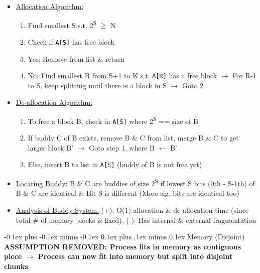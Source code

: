 \documentclass[landscape]{article}
\makeatletter
\renewcommand{\section}{\@startsection{section}{1}{0mm}%
  {-0.1ex plus -0.1ex minus -0.1ex}%
  {0.1ex plus .1ex minus 0.1ex}%
{\normalfont\small\bfseries}}
\makeatother
\begin{document}
\begin{multicols*}{6}
\begin{itemize}
\begin{itemize}
        \item \underline{Allocation Algorithm:}
        \begin{enumerate}
          \item Find smallest S s.t. 2\textsuperscript{S} $\geq$ N 
          \item Check if \verb|A[S]| has free block
          \item Yes: Remove from list \& return
          \item No: Find smallest R from S+1 to K s.t. \verb|A[R]| has a free block $\rightarrow$ For R-1 to S, keep splitting until there is a block in S $\rightarrow$ Goto 2
        \end{enumerate}
        \item \underline{De-allocation Algorithm:}
        \begin{enumerate}
          \item To free a block B, check in \verb|A[S]| where 2\textsuperscript{S} == size of B
          \item If buddy C of B exists, remove B \& C from list, merge B \& C to get larger block B' $\rightarrow$ Goto step 1, where B $\leftarrow$ B'
          \item Else, insert B to list in \verb|A[S]| (buddy of B is not free yet)
        \end{enumerate}
        \item \underline{Locating Buddy:} B \& C are buddies of size 2\textsuperscript{S} if lowest S bits (0th - S-1th) of B \& C are identical \& Bit S is different (More sig. bits are identical too)
        \item \underline{Analysis of Buddy System:} (+): O(1) allocation \& de-allocation time (since total \# of memory blocks is fixed), (-): Has internal \& external fragmentation
      \end{itemize}
    \end{itemize}

    \section{Memory (Disjoint)}
    \textbf{ASSUMPTION REMOVED: Process fits in memory as contiguous piece $\rightarrow$ Process can now fit into memory but split into disjoint chunks}

\end{multicols*}
\end{document}
